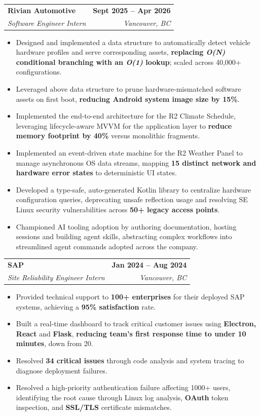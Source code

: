\documentclass[letterpaper,11pt]{article}
\makeatletter
\newcommand{\bluey}[1]{{\color{customblue}#1}}
\newcommand{\resumeItem}[1]{
  \item\small{
    {#1 \vspace{-2pt}}
  }
}
\newcommand{\resumeSubheading}[4]{
  \vspace{-2pt}\item
    \begin{tabular*}{1.0\textwidth}[t]{l@{\extracolsep{\fill}}r}
      \textbf{#1} & \textbf{\small #2} \\
      \textit{\small#3} & \textit{\small #4} \\
    \end{tabular*}\vspace{-7pt}
}
\newcommand{\resumeItemListStart}{\begin{itemize}[leftmargin=0.2in]}
\newcommand{\resumeItemListEnd}{\end{itemize}\vspace{-5pt}}
\makeatother
\begin{document}
        \resumeSubheading
        {\bluey{Rivian Automotive}}{Sept 2025 -- Apr 2026}
        {\bluey{Software Engineer Intern}}{Vancouver, BC}
        \resumeItemListStart
            \resumeItem{Designed and implemented a data structure to automatically detect vehicle hardware profiles and serve corresponding assets, \textbf{replacing \textit{O(N)} conditional branching with an \textit{O(1)} lookup}; scaled across 40,000+ configurations.}
            \resumeItem{Leveraged above data structure to prune hardware-mismatched software assets on first boot, \textbf{reducing Android system image size by 15\%}.}
            \resumeItem{Implemented the end-to-end architecture for the R2 Climate Schedule, leveraging lifecycle-aware MVVM for the application layer to \textbf{reduce memory footprint by 40\%} versus monolithic fragments.}
            \resumeItem{Implemented an event-driven state machine for the R2 Weather Panel to manage asynchronous OS data streams, mapping \textbf{15 distinct network and hardware error states} to deterministic UI states.}
            \resumeItem{Developed a type-safe, auto-generated Kotlin library to centralize hardware configuration queries, deprecating unsafe reflection usage and resolving SE Linux security vulnerabilities across \textbf{50+ legacy access points}.}
            \resumeItem{Championed AI tooling adoption by authoring documentation, hosting sessions and building agent skills, abstracting complex workflows into streamlined agent commands adopted across the company.}
        \resumeItemListEnd
        
        \resumeSubheading
        {\bluey{SAP}}{Jan 2024 -- Aug 2024}
        {\bluey{Site Reliability Engineer Intern}}{Vancouver, BC}
        \resumeItemListStart
            \resumeItem{Provided technical support to \textbf{100+ enterprises} for their deployed SAP systems, achieving a \textbf{95\% satisfaction} rate.}
            \resumeItem{Built a real-time dashboard to track critical customer issues using \textbf{Electron, React} and \textbf{Flask}, \textbf{reducing team's first response time to under 10 minutes}, down from 20.}
            \resumeItem{Resolved \textbf{34 critical issues} through code analysis and system tracing to diagnose deployment failures.}
            \resumeItem{Resolved a high-priority authentication failure affecting 1000+ users, identifying the root cause through Linux log analysis, \textbf{OAuth} token inspection, and \textbf{SSL/TLS} certificate mismatches.}                
        \resumeItemListEnd
        
\end{document}
